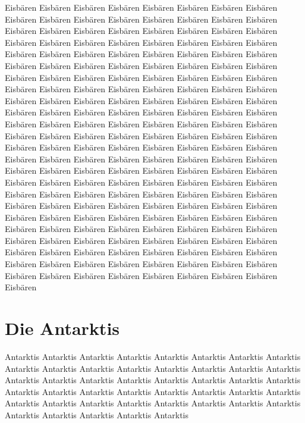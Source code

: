 \documentclass[a4paper, twoside, 12pt]{report}
\begin{document}
Eisb\"aren Eisb\"aren Eisb\"aren Eisb\"aren Eisb\"aren Eisb\"aren Eisb\"aren Eisb\"aren Eisb\"aren Eisb\"aren Eisb\"aren Eisb\"aren Eisb\"aren Eisb\"aren Eisb\"aren Eisb\"aren Eisb\"aren Eisb\"aren Eisb\"aren Eisb\"aren Eisb\"aren Eisb\"aren Eisb\"aren Eisb\"aren Eisb\"aren Eisb\"aren Eisb\"aren Eisb\"aren Eisb\"aren Eisb\"aren Eisb\"aren Eisb\"aren Eisb\"aren Eisb\"aren Eisb\"aren Eisb\"aren Eisb\"aren Eisb\"aren Eisb\"aren Eisb\"aren Eisb\"aren Eisb\"aren Eisb\"aren Eisb\"aren Eisb\"aren Eisb\"aren Eisb\"aren Eisb\"aren Eisb\"aren Eisb\"aren Eisb\"aren Eisb\"aren Eisb\"aren Eisb\"aren Eisb\"aren Eisb\"aren Eisb\"aren Eisb\"aren Eisb\"aren Eisb\"aren Eisb\"aren Eisb\"aren Eisb\"aren Eisb\"aren Eisb\"aren Eisb\"aren Eisb\"aren Eisb\"aren Eisb\"aren Eisb\"aren Eisb\"aren Eisb\"aren Eisb\"aren Eisb\"aren Eisb\"aren Eisb\"aren Eisb\"aren Eisb\"aren Eisb\"aren Eisb\"aren Eisb\"aren Eisb\"aren Eisb\"aren Eisb\"aren Eisb\"aren Eisb\"aren Eisb\"aren Eisb\"aren Eisb\"aren Eisb\"aren Eisb\"aren Eisb\"aren Eisb\"aren  Eisb\"aren Eisb\"aren Eisb\"aren Eisb\"aren Eisb\"aren Eisb\"aren Eisb\"aren Eisb\"aren Eisb\"aren Eisb\"aren Eisb\"aren Eisb\"aren Eisb\"aren Eisb\"aren Eisb\"aren Eisb\"aren Eisb\"aren Eisb\"aren Eisb\"aren Eisb\"aren Eisb\"aren Eisb\"aren Eisb\"aren Eisb\"aren Eisb\"aren Eisb\"aren Eisb\"aren Eisb\"aren Eisb\"aren Eisb\"aren Eisb\"aren Eisb\"aren Eisb\"aren Eisb\"aren Eisb\"aren Eisb\"aren Eisb\"aren Eisb\"aren Eisb\"aren Eisb\"aren Eisb\"aren Eisb\"aren Eisb\"aren Eisb\"aren Eisb\"aren Eisb\"aren Eisb\"aren Eisb\"aren Eisb\"aren Eisb\"aren Eisb\"aren Eisb\"aren Eisb\"aren Eisb\"aren Eisb\"aren Eisb\"aren Eisb\"aren Eisb\"aren Eisb\"aren Eisb\"aren Eisb\"aren Eisb\"aren Eisb\"aren Eisb\"aren Eisb\"aren Eisb\"aren Eisb\"aren Eisb\"aren Eisb\"aren Eisb\"aren Eisb\"aren Eisb\"aren Eisb\"aren Eisb\"aren Eisb\"aren Eisb\"aren Eisb\"aren Eisb\"aren Eisb\"aren Eisb\"aren Eisb\"aren Eisb\"aren Eisb\"aren Eisb\"aren Eisb\"aren Eisb\"aren Eisb\"aren Eisb\"aren Eisb\"aren Eisb\"aren Eisb\"aren Eisb\"aren Eisb\"aren Eisb\"aren Eisb\"aren Eisb\"aren Eisb\"aren Eisb\"aren Eisb\"aren Eisb\"aren 

    \chapter{Die Antarktis}
    \thispagestyle{fancy}

    Antarktis Antarktis Antarktis Antarktis Antarktis Antarktis Antarktis Antarktis Antarktis Antarktis Antarktis Antarktis Antarktis Antarktis Antarktis Antarktis Antarktis Antarktis Antarktis Antarktis Antarktis Antarktis Antarktis Antarktis Antarktis Antarktis Antarktis Antarktis Antarktis Antarktis Antarktis Antarktis Antarktis Antarktis Antarktis Antarktis Antarktis Antarktis Antarktis Antarktis Antarktis Antarktis Antarktis Antarktis Antarktis
\end{document}
